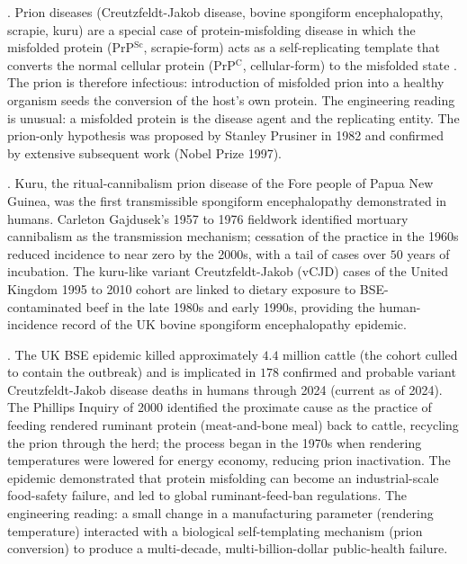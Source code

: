. Prion diseases (Creutzfeldt-Jakob disease,
bovine spongiform encephalopathy, scrapie, kuru) are a special case
of protein-misfolding disease in which the misfolded protein
(PrP$^{\text{Sc}}$, scrapie-form) acts as a self-replicating template
that converts the normal cellular protein (PrP$^{\text{C}}$,
cellular-form) to the misfolded state
\cite{paper:v6c04-prusiner-1982,paper:v6c04-collinge-prion-2001}. The
prion is therefore infectious: introduction of misfolded prion into
a healthy organism seeds the conversion of the host's own protein.
The engineering reading is unusual: a misfolded protein is the
disease agent and the replicating entity. The prion-only hypothesis
was proposed by Stanley Prusiner in 1982
\cite{paper:v6c04-prusiner-1982} and confirmed by extensive
subsequent work (Nobel Prize 1997).

. Kuru, the
ritual-cannibalism prion disease of the Fore people of Papua New
Guinea, was the first transmissible spongiform encephalopathy
demonstrated in humans. Carleton Gajdusek's 1957 to 1976 fieldwork
identified mortuary cannibalism as the transmission mechanism;
cessation of the practice in the 1960s reduced incidence to near
zero by the 2000s, with a tail of cases over $50$ years of incubation.
The kuru-like variant Creutzfeldt-Jakob (vCJD) cases of the United
Kingdom 1995 to 2010 cohort are linked to dietary exposure to
BSE-contaminated beef in the late 1980s and early 1990s, providing
the human-incidence record of the UK bovine spongiform encephalopathy
epidemic.

. The UK BSE epidemic
killed approximately $4.4$ million cattle (the cohort culled to
contain the outbreak) and is implicated in $178$ confirmed and
probable variant Creutzfeldt-Jakob disease deaths in humans through
2024 (current as of 2024). The Phillips Inquiry of 2000
\cite{paper:v6c04-phillips-bse-2000} identified the proximate cause
as the practice of feeding rendered ruminant protein (meat-and-bone
meal) back to cattle, recycling the prion through the herd; the
process began in the 1970s when rendering temperatures were lowered
for energy economy, reducing prion inactivation. The epidemic
demonstrated that protein misfolding can become an industrial-scale
food-safety failure, and led to global ruminant-feed-ban regulations.
The engineering reading: a small change in a manufacturing
parameter (rendering temperature) interacted with a biological
self-templating mechanism (prion conversion) to produce a multi-decade,
multi-billion-dollar public-health failure.

